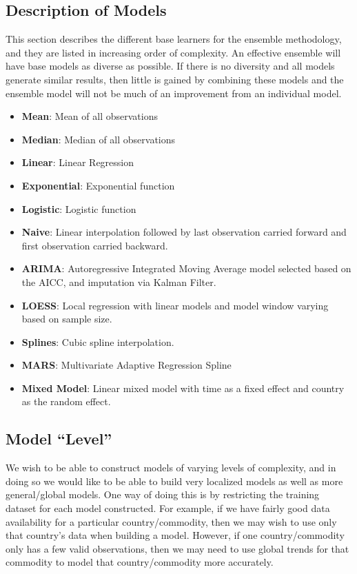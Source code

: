 \documentclass[nojss]{jss}
\begin{document}
\subsection{Description of Models}

This section describes the different base learners for the ensemble methodology, and they are listed in increasing order of complexity. An effective ensemble will have base models as diverse as possible. If there is no diversity and all models generate similar results, then little is gained by combining these models and the ensemble model will not be much of an improvement from an individual model.\\

\begin{itemize}
  \item \textbf{Mean}: Mean of all observations
  \item \textbf{Median}: Median of all observations
  \item \textbf{Linear}: Linear Regression
  \item \textbf{Exponential}: Exponential function
  \item \textbf{Logistic}: Logistic function
  \item \textbf{Naive}: Linear interpolation followed by last observation
    carried forward and first observation carried backward.
  \item \textbf{ARIMA}: Autoregressive Integrated Moving Average model
    selected based on the AICC, and imputation via Kalman Filter.
  \item \textbf{LOESS}: Local regression with linear models and model window
    varying based on sample size.
  \item \textbf{Splines}: Cubic spline interpolation.
  \item \textbf{MARS}: Multivariate Adaptive Regression Spline
  \item \textbf{Mixed Model}: Linear mixed model with time as a fixed effect
    and country as the random effect.
\end{itemize}

\subsection{Model ``Level''}

We wish to be able to construct models of varying levels of complexity, and in doing so we would like to be able to build very localized models as well as more general/global models.  One way of doing this is by restricting the training dataset for each model constructed.  For example, if we have fairly good data availability for a particular country/commodity, then we may wish to use only that country's data when building a model.  However, if one country/commodity only has a few valid observations, then we may need to use global trends for that commodity to model that country/commodity more accurately.
\end{document}
